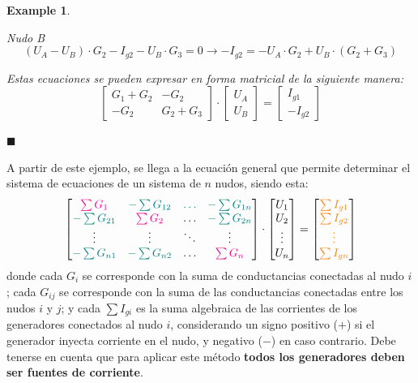 \documentclass[11pt]{book} %
\numberwithin{dummy}{section}
\theoremstyle{ocrenumbox}
\theoremstyle{blacknumex}
\newtheorem{exampleT}{Example}[chapter]
\theoremstyle{blacknumbox}
\theoremstyle{ocrenum}
\newenvironment{example}{\begin{exampleT}}{\hfill{\tiny\ensuremath{\blacksquare}}\end{exampleT}}
\newlength\esp
\begin{document}
\begin{example}
\begin{enumerate}
			Nudo B
			\begin{equation*}
				(U_A - U_B) \cdot G_2 - I_{g2} - U_B \cdot G_3 = 0 \rightarrow  - I_{g2} = - U_A \cdot G_2 + U_B \cdot (G_2 + G_3)
			\end{equation*}
			
			Estas ecuaciones se pueden expresar en forma matricial de la siguiente manera: 
			\begin{equation*}
				\begin{bmatrix}
					G_1 + G_2 & - G_2\\
					-G_2 & G_2 + G_3
				\end{bmatrix} \cdot%
				\begin{bmatrix}
					U_A\\
					U_B
				\end{bmatrix} = %
				\begin{bmatrix}
					I_{g1}\\
					-I_{g2}
				\end{bmatrix}
			\end{equation*}
		\end{enumerate}
	\end{example}
	
	A partir de este ejemplo, se llega a la ecuación general que permite determinar el sistema de ecuaciones de un sistema de $n$ nudos, siendo esta: 
	\begin{equation*}
		\begin{bmatrix}
			{\color{magenta}\sum G_{1}} &  {\color{teal}-\sum G_{12}} & {\color{teal}{\dots}} & {\color{teal}-\sum G_{1n}} \\
			{\color{teal}-\sum G_{21}} & {\color{magenta}\sum G_{2}} & {{\dots}} & {\color{teal}-\sum G_{2n}} \\
			{\vdots} & {\vdots} &  {\ddots} & \vdots\\
			{\color{teal}-\sum G_{n1}} & {\color{teal}-\sum G_{n2}} & \dots & {\color{magenta}\sum G_{n}}
		\end{bmatrix} \cdot 
		\begin{bmatrix}
			U_1\\
			U_2\\
			\vdots\\
			U_n
		\end{bmatrix} = %
		\begin{bmatrix}
			{\color{orange}\sum I_{g1}}\\
			{\color{orange}\sum I_{g2}}\\
			{\color{orange}\vdots}\\
			{\color{orange}\sum I_{gn}}
		\end{bmatrix}
	\end{equation*}
	donde cada {\color{magenta}$G_{i}$} se corresponde con la suma de conductancias conectadas al nudo $i$; cada {\color{teal}$ G_{ij}$} se corresponde con la suma de las conductancias conectadas entre los nudos $i$ y $j$; y cada {\color{orange} $\sum I_{gi}$} es la suma algebraica de las corrientes de los generadores conectados al nudo $i$, considerando un signo positivo ($+$) si el generador inyecta corriente en el nudo, y negativo ($-$) en caso contrario. Debe tenerse en cuenta que para aplicar este método \textbf{todos los generadores deben ser fuentes de corriente}. 
	
\end{document}
